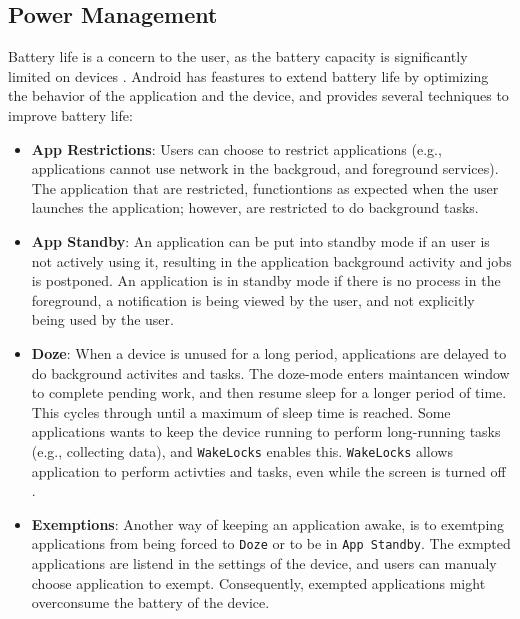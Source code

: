 \subsection{Power Management}
Battery life is a concern to the user, as the battery capacity is significantly limited on devices \cite{powermanagement}. Android has feastures to extend battery life by optimizing the behavior of the application and the device, and provides several techniques to improve battery life:
\begin{itemize}
    \item \textbf{App Restrictions}: Users can choose to restrict applications (e.g., applications cannot use network in the backgroud, and foreground services). The application that are restricted, functiontions as expected when the user launches the application; however, are restricted to do background tasks. 
    \item \textbf{App Standby}: An application can be put into standby mode if an user is not actively using it, resulting in the application background activity and jobs is postponed. An application is in standby mode if there is no process in the foreground, a notification is being viewed by the user, and not explicitly being used by the user. 
    \item \textbf{Doze}: When a device is unused for a long period, applications are delayed to do background activites and tasks. The doze-mode enters maintancen window to complete pending work, and then resume sleep for a longer period of time. This cycles through until a maximum of sleep time is reached. Some applications wants to keep the device running to perform long-running tasks (e.g., collecting data), and \verb|WakeLocks| enables this. \verb|WakeLocks| allows application to perform activties and tasks, even while the screen is turned off \cite{wakelocks}. 
    \item \textbf{Exemptions}: Another way of keeping an application awake, is to exemtping applications from being forced to \verb|Doze| or to be in \verb|App Standby|. The exmpted applications are listend in the settings of the device, and users can manualy choose application to exempt. Consequently, exempted applications might overconsume the battery of the device. 
\end{itemize}


